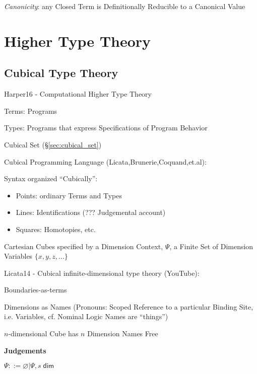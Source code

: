\emph{Canonicity}: any Closed Term is Definitionally Reducible to a
Canonical Value



\section{Higher Type Theory}\label{sec:higher_type_theory}

\subsection{Cubical Type Theory}\label{sec:cubical_type_theory}

Harper16 - Computational Higher Type Theory

Terms: Programs

Types: Programs that express Specifications of Program Behavior

Cubical Set (\S\ref{sec:cubical_set})

Cubical Programming Language (Licata,Brunerie,Coquand,et.al):

Syntax organized ``Cubically'':
\begin{itemize}
  \item Points: ordinary Terms and Types
  \item Lines: Identifications (??? Judgemental account)
  \item Squares: Homotopies, etc.
\end{itemize}

Cartesian Cubes specified by a Dimension Context, $\Psi$, a Finite Set
of Dimension Variables $\{x,y,z,\ldots\}$


Licata14 - Cubical infinite-dimensional type theory (YouTube):

Boundaries-as-terms

Dimensions as Names (Pronouns: Scoped Reference to a particular
Binding Site, i.e. Variables, cf. Nominal Logic Names are ``things'')

$n$-dimensional Cube has $n$ Dimension Names Free


\textbf{Judgements}

$\Psi ::= \varnothing | \Psi, s \;\mathsf{dim}$



